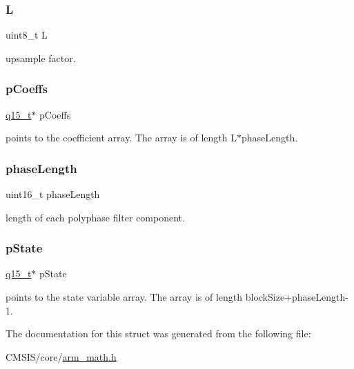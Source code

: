 \subsubsection{\texorpdfstring{L}{L}}
{\footnotesize\ttfamily uint8\+\_\+t L}

upsample factor. \mbox{\label{structarm__fir__interpolate__instance__q15_a7ca181a37f714d174445f486bebce26f}} 
\subsubsection{\texorpdfstring{pCoeffs}{pCoeffs}}
{\footnotesize\ttfamily \mbox{\hyperlink{arm__math_8h_ab5a8fb21a5b3b983d5f54f31614052ea}{q15\+\_\+t}}$\ast$ p\+Coeffs}

points to the coefficient array. The array is of length L$\ast$phase\+Length. \mbox{\label{structarm__fir__interpolate__instance__q15_a8f92bb07e0812f94679438cdf412b26a}} 
\subsubsection{\texorpdfstring{phaseLength}{phaseLength}}
{\footnotesize\ttfamily uint16\+\_\+t phase\+Length}

length of each polyphase filter component. \mbox{\label{structarm__fir__interpolate__instance__q15_ae29dfdb736374fcddaeaec4b7770170c}} 
\subsubsection{\texorpdfstring{pState}{pState}}
{\footnotesize\ttfamily \mbox{\hyperlink{arm__math_8h_ab5a8fb21a5b3b983d5f54f31614052ea}{q15\+\_\+t}}$\ast$ p\+State}

points to the state variable array. The array is of length block\+Size+phase\+Length-\/1. 

The documentation for this struct was generated from the following file\+:\begin{DoxyCompactItemize}
\item 
C\+M\+S\+I\+S/core/\mbox{\hyperlink{arm__math_8h}{arm\+\_\+math.\+h}}\end{DoxyCompactItemize}
